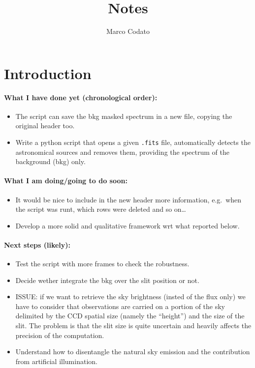\documentclass{article}
\author{Marco Codato}
\title{Notes}
\begin{document}
\maketitle

\section{Introduction}

\paragraph{What I have done yet (chronological order):}
\begin{itemize}
	\item The script can save the bkg masked spectrum in a new file, copying the original header too.
	\item Write a python script that opens a given \texttt{.fits} file, automatically detects the astronomical sources and removes them, providing the spectrum of the background (bkg) only.
\end{itemize}

\paragraph{What I am doing/going to do soon:}
\begin{itemize}
	\item It would be nice to include in the new header more information, e.g.\ when the script was runt, which rows were deleted and so on\dots
	\item Develop a more solid and qualitative framework wrt what reported below.
\end{itemize}




\paragraph{Next steps (likely):}
\begin{itemize}
	\item Test the script with more frames to check the robustness.
	\item Decide wether integrate the bkg over the slit position or not.
	\item ISSUE: if we want to retrieve the sky brightness (insted of the flux only) we have to consider that observations are carried on a portion of the sky delimited by the CCD spatial size (namely the ``height'') and the size of the slit. The problem is that the slit size is quite uncertain and heavily affects the precision of the computation.
	\item Understand how to disentangle the natural sky emission and the contribution from artificial illumination.
\end{itemize}
\end{document}
